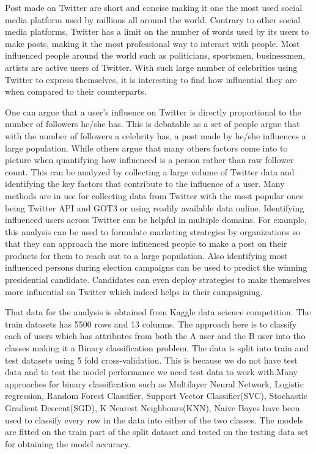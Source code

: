 \documentclass[sigconf]{acmart}
\begin{document}
Post made on Twitter are short and concise making it one the most used social media platform used by millions all around the world. Contrary to other social media platforms, Twitter has a limit on the number of words used by its users to make posts, making it the most professional way to interact with people. Most influenced people around the world such as politicians, sportsmen, businessmen, artists are active users of Twitter. With such large number of celebrities using Twitter to express themselves, it is interesting to find how influential they are when compared to their counterparts.

One can argue that a user's influence on Twitter is directly proportional to the number of followers he/she has. This is debatable as a set of people argue that with the number of followers a celebrity has, a post made by he/she influences a large population. While others argue that many others factors come into to picture when quantifying how influenced is a person rather than raw follower count. This can be analyzed by collecting a large volume of Twitter data and identifying the key factors that contribute to the influence of a user. Many methods are in use for collecting data from Twitter with the most popular ones being Twitter API and GOT3 or using readily available data online. Identifying influenced users across Twitter can be helpful in multiple domains. For example, this analysis can be used to formulate marketing strategies by organizations so that they can approach the more influenced people to make a post on their products for them to reach out to a large population. Also identifying most influenced persons during election campaigns can be used to predict the winning presidential candidate. Candidates can even deploy strategies to make themselves more influential on Twitter which indeed helps in their campaigning.

That data for the analysis is obtained from Kaggle data science competition. The train datasets has 5500 rows and 13 columns. The approach here is to classify each of users which has attributes from both the A user and the B user into tho classes making it a Binary classification problem. The data is split into train and test datasets using 5 fold cross-validation. This is because we do not have test data and to test the model performance we need test data to work with.Many approaches for binary classification such as Multilayer Neural Network, Logistic regression, Random Forest Classifier, Support Vector Classifier(SVC), Stochastic Gradient Descent(SGD), K Nearest Neighbours(KNN), Naive Bayes have been used to classify every row in the data into either of the two classes. The models are fitted on the train part of the split dataset and tested on the testing data set for obtaining the model accuracy.
\end{document}
